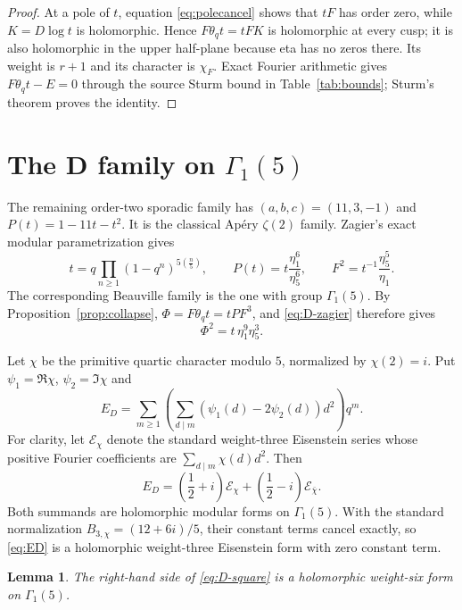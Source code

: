 \documentclass[11pt]{article}
\newtheorem{lemma}[theorem]{Lemma}
\theoremstyle{remark}
\newcommand{\thq}{\theta_q}
\begin{document}
\begin{proof}
At a pole of $t$, equation \eqref{eq:polecancel} shows that $tF$ has order
zero, while $K=D\log t$ is holomorphic.  Hence $F\thq t=tFK$ is holomorphic at
every cusp; it is also holomorphic in the upper half-plane because eta has no
zeros there.  Its weight is $r+1$ and its character is $\chi_F$.
Exact Fourier arithmetic gives $F\thq t-E=0$ through the source Sturm bound in
Table~\ref{tab:bounds}; Sturm's theorem proves the identity.
\end{proof}

\section{The $\mathbf D$ family on $\Gamma_1(5)$}

The remaining order-two sporadic family has $(a,b,c)=(11,3,-1)$ and
$P(t)=1-11t-t^2$.  It is the classical Ap\'ery $\zeta(2)$ family.  Zagier's
exact modular parametrization \cite{Zagier} gives
\begin{equation}
 t=q\prod_{n\ge1}(1-q^n)^{5(\frac n5)},\qquad
 P(t)=t\frac{\eta_1^6}{\eta_5^6},\qquad
 F^2=t^{-1}\frac{\eta_5^5}{\eta_1}.
 \label{eq:D-zagier}
\end{equation}
The corresponding Beauville family is the one with group $\Gamma_1(5)$.
By Proposition~\ref{prop:collapse}, $\Phi=F\thq t=tPF^3$, and
\eqref{eq:D-zagier} therefore gives
\begin{equation}
 \boxed{\ \Phi^2=t\,\eta_1^9\eta_5^3.\ }
 \label{eq:D-square}
\end{equation}

Let $\chi$ be the primitive quartic character modulo $5$, normalized by
$\chi(2)=i$.  Put $\psi_1=\Re\chi$, $\psi_2=\Im\chi$ and
\begin{equation}
 E_D=\sum_{m\ge1}\left(\sum_{d\mid m}(\psi_1(d)-2\psi_2(d))d^2\right)q^m.
 \label{eq:ED}
\end{equation}
For clarity, let $\mathcal E_\chi$ denote the standard weight-three
Eisenstein series whose positive Fourier coefficients are
$\sum_{d\mid m}\chi(d)d^2$.  Then
\[
 E_D=\left(\frac12+i\right)\mathcal E_\chi
     +\left(\frac12-i\right)\mathcal E_{\bar\chi}.
\]
Both summands are holomorphic modular forms on $\Gamma_1(5)$.  With the
standard normalization $B_{3,\chi}=(12+6i)/5$, their constant terms cancel
exactly, so \eqref{eq:ED} is a holomorphic weight-three Eisenstein form with
zero constant term.

\begin{lemma}\label{lem:D-holo}
The right-hand side of \eqref{eq:D-square} is a holomorphic weight-six form
on $\Gamma_1(5)$.
\end{lemma}
\end{document}
